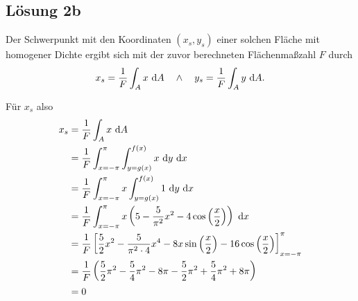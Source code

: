 \documentclass[main.tex]{subfiles}
\begin{document}
\subsection{Lösung 2b}
Der Schwerpunkt mit den Koordinaten $(x_s, y_s)$ einer solchen Fläche mit homogener Dichte ergibt sich mit der zuvor berechneten Flächenmaßzahl $F$ durch
\begin{align*}
    x_s = \frac{1}{F} \int_{A}x ~\mathrm{d}A \quad \wedge \quad y_s = \frac{1}{F} \int_{A} y ~\mathrm{d}A.
\end{align*}

Für $x_s$ also
\begin{align*}
    x_s &= \frac{1}{F} \int_{A}x ~\mathrm{d}A \\
        &= \frac{1}{F}\int_{x=-\pi}^{\pi} \int_{y=g(x)}^{f(x)} x ~\mathrm{d}y ~\mathrm{d}x \\
        &= \frac{1}{F}\int_{x=-\pi}^{\pi} x \int_{y=g(x)}^{f(x)} 1 ~\mathrm{d}y ~\mathrm{d}x \\
        &= \frac{1}{F}\int_{x=-\pi}^{\pi} x \left(5 - \frac{5}{\pi^2} x^2 - 4 \cos \left(\frac{x}{2} \right)\right) ~\mathrm{d}x \\
        &= \frac{1}{F} \left[ \frac{5}{2} x^2 - \frac{5}{\pi^2\cdot 4} x^4 - 8x \sin \left(\frac{x}{2}\right) - 16 \cos \left(\frac{x}{2} \right) \right]_{x=-\pi}^{\pi} \\
        &= \frac{1}{F} \left( \frac{5}{2} \pi^2 - \frac{5}{4} \pi^2 - 8\pi - \frac{5}{2} \pi^2 + \frac{5}{4} \pi^2 + 8\pi \right)\\
        &= 0 \\
\end{align*}
\end{document}
